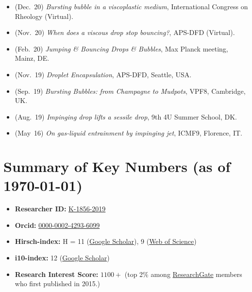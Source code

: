 \begin{itemize}[leftmargin=1.5em]
\item[\textbullet] (Dec.~20) \emph{Bursting bubble in a viscoplastic medium}, International Congress on Rheology (Virtual). \href{https://youtu.be/52D6nfaHbYg?si=lE3oQGiMZe3UCT6j}{\color{red}\faYoutube}
\item[\textbullet] (Nov.~20) \emph{When does a viscous drop stop bouncing?}, APS-DFD (Virtual). \href{https://youtu.be/9JCV9JFwr2A?si=Vs1ljwdmZrzHUOXX}{\color{red}\faYoutube}
\item[\textbullet] (Feb.~20) \emph{Jumping \& Bouncing Drops \& Bubbles}, Max Planck meeting, Mainz, DE.
\item[\textbullet] (Nov.~19) \emph{Droplet Encapsulation}, APS-DFD, Seattle, USA.
\item[\textbullet] (Sep.~19) \emph{Bursting Bubbles: from Champagne to Mudpots}, VPF8, Cambridge, UK.
\item[\textbullet] (Aug.~19) \emph{Impinging drop lifts a sessile drop}, 9th 4U Summer School, DK.
\item[\textbullet] (May~16) \emph{On gas-liquid entrainment by impinging jet}, ICMF9, Florence, IT.
\end{itemize}

\section{Summary of Key Numbers (as of \today)}
\begin{itemize}[leftmargin=1.5em]
\item \faIdCard\hspace{0.3em}\textbf{Researcher ID:} \href{https://www.webofscience.com/wos/author/record/K-1856-2019}{K-1856-2019}
\item \faOrcid\hspace{0.3em}\textbf{Orcid:} \href{https://orcid.org/0000-0002-4293-6099}{0000-0002-4293-6099}
\item \faChartLine\hspace{0.3em}\textbf{Hirsch-index:} H = 11 (\href{https://scholar.google.com/citations?hl=en&user=tHb_qZoAAAAJ}{Google Scholar}), 9 (\href{https://www.webofscience.com/wos/author/record/K-1856-2019}{Web of Science})
\item \faFile\hspace{0.3em}\textbf{i10-index:} 12 (\href{https://scholar.google.com/citations?hl=en&user=tHb_qZoAAAAJ}{Google Scholar})
\item \faUsers\hspace{0.3em}\textbf{Research Interest Score:} \(1100+\) (top 2\% among \href{https://www.researchgate.net/profile/Vatsal-Sanjay-2}{ResearchGate} members who first published in 2015.)
\end{itemize}



